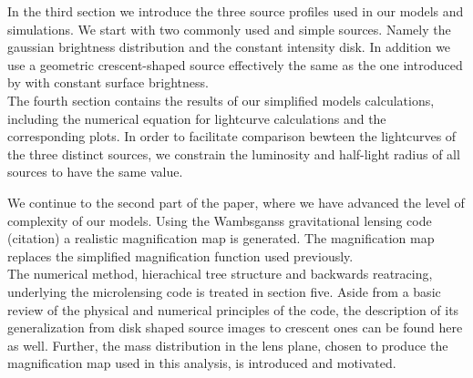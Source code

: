 In the third section we introduce the three source profiles used in our models and simulations. We start with two commonly used and simple sources. Namely the gaussian brightness distribution and the constant intensity disk. In addition we use a geometric crescent-shaped source effectively the same as the one introduced by \citep{2013MNRAS.434..765K} with constant surface brightness. \\
The fourth section contains the results of our simplified models calculations, including the numerical equation for lightcurve calculations and the corresponding plots. In order to facilitate comparison bewteen the lightcurves of the three distinct sources, we constrain the luminosity and half-light radius of all sources to have the same value.    
       
We continue to the second part of the paper, where we have advanced the level of complexity of our models. Using the Wambsganss gravitational lensing code (citation) a realistic magnification map is generated. The magnification map replaces the simplified magnification function used previously.  \\
The numerical method, hierachical tree structure and backwards reatracing, underlying the microlensing code is treated in section five. Aside from a basic review of the physical and numerical principles of the code, the description of its generalization from disk shaped source images to crescent ones can be found here as well. Further, the mass distribution in the lens plane, chosen to produce the magnification map used in this analysis, is introduced and motivated.   
